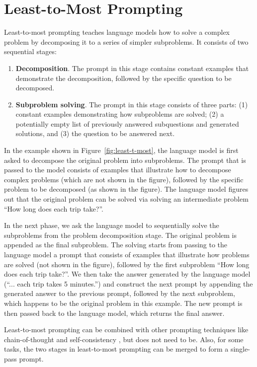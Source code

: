 \documentclass{article}
\begin{document}
\section{Least-to-Most Prompting}
\label{sec:method}



Least-to-most prompting teaches language models how to solve a complex problem by decomposing it to a series of  simpler subproblems. It consists of two sequential stages:
\begin{enumerate}
\item \textbf{Decomposition}. The prompt in this stage contains constant examples that demonstrate the decomposition, followed by the specific question to be decomposed.

\item \textbf{Subproblem solving}. The prompt in this stage consists of three parts: (1) constant examples demonstrating how subproblems are solved; (2) a potentially empty list of previously answered subquestions and generated solutions, and (3) the question to be answered next.
\end{enumerate}
 

In the example shown in Figure~\ref{fig:least-t-most}, the language model is first asked to decompose the original problem into subproblems. The prompt that is passed to the model consists of examples that illustrate how to decompose complex problems (which are not shown in the figure), followed by the specific problem to be decomposed (as shown in the figure). The language model figures out that the original problem can be solved via solving an intermediate problem ``How long does each trip take?''.

In the next phase, we ask the language model to sequentially solve %
the subproblems from the problem decomposition stage. The original problem is appended as the final subproblem. The solving  starts from passing to the language model a prompt that consists of examples that illustrate how problems are solved (not shown in the figure), followed by the first subproblem ``How long does each trip take?''. We then take the answer generated by the language model (``... each trip takes 5 minutes.'') and construct the next prompt by appending the generated answer to the previous prompt, followed by the next subproblem, which happens to be the original problem in this example. The new prompt is then passed back to the language model, which returns the final answer.

Least-to-most prompting can be combined with other prompting techniques like chain-of-thought \citep{wei2022chain} and self-consistency \citep{wang2022self}, but does not need to be. Also, for some tasks, the two stages in least-to-most prompting can be merged to form a single-pass prompt.
\end{document}

